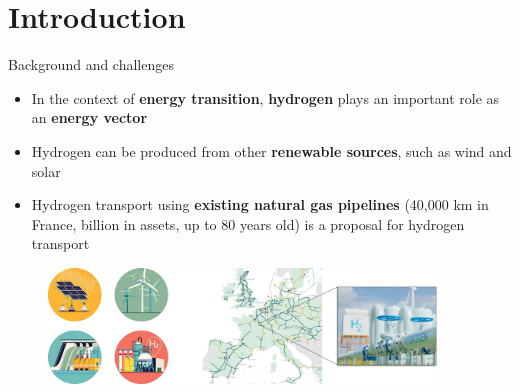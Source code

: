 \documentclass[9pt]{beamer}
\author[Daniella LOPES PINTO]{Daniella LOPES PINTO \textsuperscript{1,2*} \\ 
\texttt{\textcolor{black}{daniella.lopes\_pinto@minesparis.psl.eu}}}
\subtitle{\LARGE Finite element models for the study of hydrogen embrittlement of steel structures}
\institute
{\textbf{Thesis director}: Jacques BESSON \textsuperscript{1} \\
\vspace{0.25cm}
\textbf{Industrial advisor}: Nikolay OSIPOV \textsuperscript{2} \\
\vspace{0.4cm}
{\textsuperscript{1} Centre des Matériaux, Mines Paris} \\
\vspace{0.15cm}
\textsuperscript{2} Transvalor S.A. \\
\vspace{0.2cm}
\center{\textbf{Thesis defense} \\ \small March 7\textsuperscript{th} 2025} 
\center{\textcolor{white}{XXXXXXXX}}}
\begin{document}
\begin{frame}[plain]
    \maketitle
\end{frame}

\section{Introduction}


\begin{frame}{Background and challenges}

    \begin{itemize}
		\item In the context of \textbf{energy transition}, \textbf{hydrogen} plays an important role as an \textbf{energy vector}
		\vspace{0.15cm}
		\item Hydrogen can be produced from other \textbf{renewable sources}, such as wind and solar
		\vspace{0.15cm}
		\item Hydrogen transport using \textbf{existing natural gas pipelines} (40,000 km in France,  billion in assets, up to 80 years old) is a proposal for hydrogen transport
    \end{itemize}
    
    \vspace{0.2cm}

\begin{figure}
	\centering
	\includegraphics[width=0.92\textwidth]{Images/Context.pdf}
\end{figure}
    
\end{frame}

\end{document}

